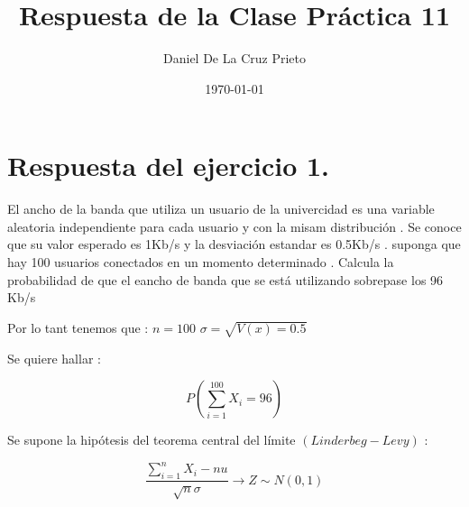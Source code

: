 \documentclass[10pt]{article}
\begin{document}
	\title{Respuesta de la Clase Pr\'actica 11}
	\author{Daniel De La Cruz Prieto}
	\date{\today}
	\maketitle
	
	\section*{Respuesta del ejercicio 1.}
    \begin{flushleft}
    	El ancho de la banda que utiliza un usuario de la univercidad es una variable aleatoria independiente para cada usuario y con la misam distribuci\'on . Se conoce que su valor esperado es 1Kb/s y la desviaci\'on estandar es 0.5Kb/s . suponga que hay 100 usuarios conectados en un momento determinado . Calcula la probabilidad de que el eancho de banda que se est\'a utilizando sobrepase los 96 Kb/s
    \end{flushleft}
    
    \begin{flushleft}
     	Por lo tant	tenemos que : $ n = 100 $  \hspace{1cm} $ \sigma = \sqrt{V(x) = 0.5}$
    \end{flushleft}
    
    \begin{flushleft}
	    Se quiere hallar :
    \end{flushleft}
    
   	\begin{equation*}
   	    P \left(\sum_{i=1}^{100} X_{i} = 96\right)
   	\end{equation*}
   	
    \begin{flushleft}
   	   Se supone la hip\'otesis del teorema central del l\'imite $ \left(Linderbeg - Levy\right)$ :
    \end{flushleft}
   	
   	\begin{equation*}
   	   \displaystyle\frac{\sum_{i=1}^{n} X_i -nu}{\sqrt{n}\sigma} \longrightarrow Z\sim N (0,1)
   	\end{equation*}
   	
\end{document}
